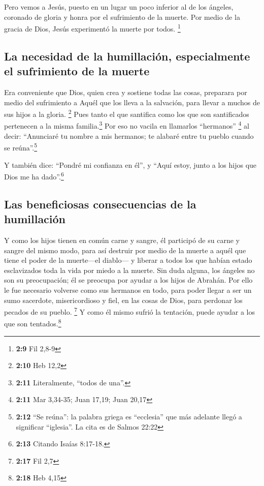  Pero vemos a Jesús, puesto en un lugar un poco inferior
al de los ángeles, coronado de gloria y honra por el sufrimiento de la
muerte. Por medio de la gracia de Dios, Jesús experimentó la muerte por
todos. \footnote{\textbf{2:9} Fil 2,8-9}

\hypertarget{la-necesidad-de-la-humillaciuxf3n-especialmente-el-sufrimiento-de-la-muerte}{%
\subsection{La necesidad de la humillación, especialmente el sufrimiento
de la
muerte}\label{la-necesidad-de-la-humillaciuxf3n-especialmente-el-sufrimiento-de-la-muerte}}

 Era conveniente que Dios, quien crea y sostiene todas
las cosas, preparara por medio del sufrimiento a Aquél que los lleva a
la salvación, para llevar a muchos de sus hijos a la gloria. \footnote{\textbf{2:10}
  Heb 12,2}  Pues tanto el que santifica como los que son
santificados pertenecen a la misma familia.\footnote{\textbf{2:11}
  Literalmente, ``todos de una''.} Por eso no vacila en llamarlos
``hermanos'' \footnote{\textbf{2:11} Mar 3,34-35; Juan 17,19; Juan 20,17}
 al decir: ``Anunciaré tu nombre a mis hermanos; te
alabaré entre tu pueblo cuando se reúna''.\footnote{\textbf{2:12} ``Se
  reúna'': la palabra griega es ``ecclesia'' que más adelante llegó a
  significar ``iglesia''. La cita es de Salmos 22:22}

 Y también dice: ``Pondré mi confianza en él'', y ``Aquí
estoy, junto a los hijos que Dios me ha dado''.\footnote{\textbf{2:13}
  Citando Isaías 8:17-18.}

\hypertarget{las-beneficiosas-consecuencias-de-la-humillaciuxf3n}{%
\subsection{Las beneficiosas consecuencias de la
humillación}\label{las-beneficiosas-consecuencias-de-la-humillaciuxf3n}}

 Y como los hijos tienen en común carne y sangre, él
participó de su carne y sangre del mismo modo, para así destruir por
medio de la muerte a aquél que tiene el poder de la muerte---el
diablo---  y liberar a todos los que habían estado
esclavizados toda la vida por miedo a la muerte.  Sin
duda alguna, los ángeles no son su preocupación; él se preocupa por
ayudar a los hijos de Abrahán.  Por ello le fue necesario
volverse como sus hermanos en todo, para poder llegar a ser un sumo
sacerdote, misericordioso y fiel, en las cosas de Dios, para perdonar
los pecados de su pueblo. \footnote{\textbf{2:17} Fil 2,7}
 Y como él mismo sufrió la tentación, puede ayudar a los
que son tentados.\footnote{\textbf{2:18} Heb 4,15}

